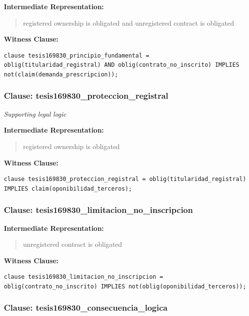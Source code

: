 \documentclass[11pt,a4paper]{article}
\begin{document}
\textbf{Intermediate Representation:}

\begin{quote}
registered ownership is obligated and unregistered contract is obligated
\end{quote}

\textbf{Witness Clause:}

\begin{lstlisting}[style=witnessstyle, language=Witness]
clause tesis169830_principio_fundamental = oblig(titularidad_registral) AND oblig(contrato_no_inscrito) IMPLIES not(claim(demanda_prescripcion));
\end{lstlisting}

\subsubsection{Clause: tesis169830\_proteccion\_registral}

\textit{Supporting legal logic}

\textbf{Intermediate Representation:}

\begin{quote}
registered ownership is obligated
\end{quote}

\textbf{Witness Clause:}

\begin{lstlisting}[style=witnessstyle, language=Witness]
clause tesis169830_proteccion_registral = oblig(titularidad_registral) IMPLIES claim(oponibilidad_terceros);
\end{lstlisting}

\subsubsection{Clause: tesis169830\_limitacion\_no\_inscripcion}

\textbf{Intermediate Representation:}

\begin{quote}
unregistered contract is obligated
\end{quote}

\textbf{Witness Clause:}

\begin{lstlisting}[style=witnessstyle, language=Witness]
clause tesis169830_limitacion_no_inscripcion = oblig(contrato_no_inscrito) IMPLIES not(oblig(oponibilidad_terceros));
\end{lstlisting}

\subsubsection{Clause: tesis169830\_consecuencia\_logica}
\end{document}
